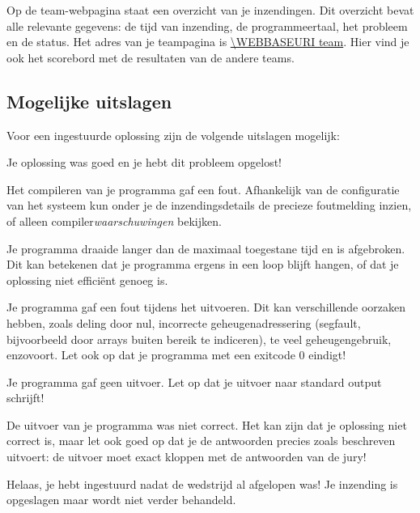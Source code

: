 Op de team-webpagina staat een overzicht van je inzendingen.
Dit overzicht bevat alle relevante gegevens: de tijd van inzending, de
programmeertaal, het probleem en de status. Het adres van je
teampagina is \url{\WEBBASEURI team}. Hier vind je ook het scorebord
met de resultaten van de andere teams.

\subsection{Mogelijke uitslagen}

Voor een ingestuurde oplossing zijn de volgende uitslagen mogelijk:

\begin{description}[\setleftmargin{4.5cm}]
\item[CORRECT]
Je oplossing was goed en je hebt dit probleem opgelost!

\item[COMPILER-ERROR]
Het compileren van je programma gaf een fout. Afhankelijk van de
configuratie van het systeem kun onder je de inzendingsdetails de
precieze foutmelding inzien, of alleen compiler\emph{waarschuwingen}
bekijken.

\item[TIMELIMIT]
Je programma draaide langer dan de maximaal toegestane tijd en is
afgebroken. Dit kan betekenen dat je programma ergens in een loop
blijft hangen, of dat je oplossing niet effici\"ent genoeg is.

\item[RUN-ERROR]
Je programma gaf een fout tijdens het uitvoeren. Dit kan verschillende
oorzaken hebben, zoals deling door nul, incorrecte geheugenadressering
(segfault, bijvoorbeeld door arrays buiten bereik te indiceren), te
veel geheugengebruik, enzovoort.
Let ook op dat je programma met een exitcode 0 eindigt!

\item[NO-OUTPUT]
Je programma gaf geen uitvoer. Let op dat je uitvoer naar standard
output schrijft!

\item[WRONG-ANSWER]
De uitvoer van je programma was niet correct. Het kan zijn dat je
oplossing niet correct is, maar let ook goed op dat je de antwoorden
precies zoals beschreven uitvoert: de uitvoer moet exact kloppen met
de antwoorden van de jury!

\item[TOO-LATE]
Helaas, je hebt ingestuurd nadat de wedstrijd al afgelopen was!
Je inzending is opgeslagen maar wordt niet verder behandeld.
\end{description}

